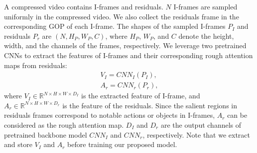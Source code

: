 \documentclass[a4paper,conference]{IEEEtran}
\begin{document}
A compressed video contains I-frames and residuals. $N$ I-frames are sampled uniformly in the compressed video. We also collect the residuals frame in the corresponding GOP of each I-frame.  The shapes of the sampled I-frames $P_I$ and residuals $P_r$ are $(N, H_P, W_P, C)$, where $H_P$, $W_P$, and $C$ denote the height, width, and the channels of the frames, respectively. We leverage two pretrained CNNs to extract the features of I-frames and their corresponding rough attention maps from residuals: 
\begin{equation}
\begin{aligned}
V_I = CNN_{I}(P_I),\\ A_{r} = CNN_{r}(P_{r}),
\end{aligned}
\end{equation}
where $ V_I \in \mathbb{R}^{ N\times H \times W \times D_I}$ is the extracted feature of I-frame, and $A_r \in \mathbb{R}^{N \times H \times W \times D_r}$ is the feature of the residuals. Since the salient regions in residuals frames correspond to notable actions or objects in I-frames, $A_r$ can be considered as the rough attention map. $D_I$ and $D_r$ are the output channels of pretrained backbone model $CNN_I$ and $CNN_r$, respectively. Note that we extract and store $V_I$ and $A_r$ before training our proposed model.
\end{document}
